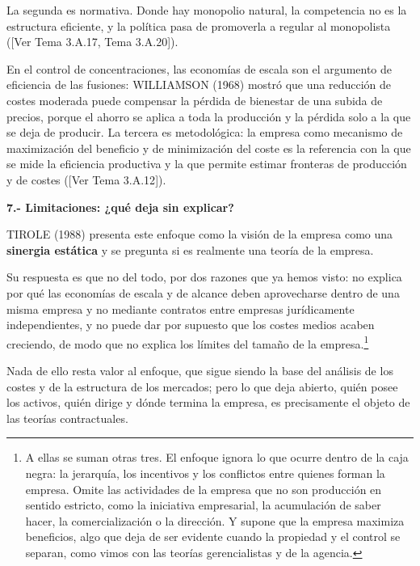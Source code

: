 \documentclass[10pt,a4paper]{article}
\newcommand{\authorfont}[1]{{\fontfamily{EBGaramond-TLF}\selectfont #1}}
\begin{document}
La segunda es normativa. Donde hay monopolio natural, la competencia no es la estructura eficiente, y la política pasa de promoverla a regular al monopolista ([\authorfont{Ver Tema 3.A.17, Tema 3.A.20}]). 

En el control de concentraciones, las economías de escala son el argumento de eficiencia de las fusiones: WILLIAMSON (1968) mostró que una reducción de costes moderada puede compensar la pérdida de bienestar de una subida de precios, porque el ahorro se aplica a toda la producción y la pérdida solo a la que se deja de producir. La tercera es metodológica: la empresa como mecanismo de maximización del beneficio y de minimización del coste es la referencia con la que se mide la eficiencia productiva y la que permite estimar fronteras de producción y de costes ([\authorfont{Ver Tema 3.A.12}]).

\textbf{7.- Limitaciones: ¿qué deja sin explicar?}

TIROLE (1988) presenta este enfoque como la visión de la empresa como una \textbf{sinergia estática} y se pregunta si es realmente una teoría de la empresa. 

Su respuesta es que no del todo, por dos razones que ya hemos visto: no explica por qué las economías de escala y de alcance deben aprovecharse dentro de una misma empresa y no mediante contratos entre empresas jurídicamente independientes, y no puede dar por supuesto que los costes medios acaben creciendo, de modo que no explica los límites del tamaño de la empresa.\footnote{%
  A ellas se suman otras tres. El enfoque ignora lo que ocurre dentro de la caja negra: la jerarquía, los incentivos y los conflictos entre quienes forman la empresa. Omite las actividades de la empresa que no son producción en sentido estricto, como la iniciativa empresarial, la acumulación de saber hacer, la comercialización o la dirección. Y supone que la empresa maximiza beneficios, algo que deja de ser evidente cuando la propiedad y el control se separan, como vimos con las teorías gerencialistas y de la agencia.
}

Nada de ello resta valor al enfoque, que sigue siendo la base del análisis de los costes y de la estructura de los mercados; pero lo que deja abierto, quién posee los activos, quién dirige y dónde termina la empresa, es precisamente el objeto de las teorías contractuales.
\end{document}
